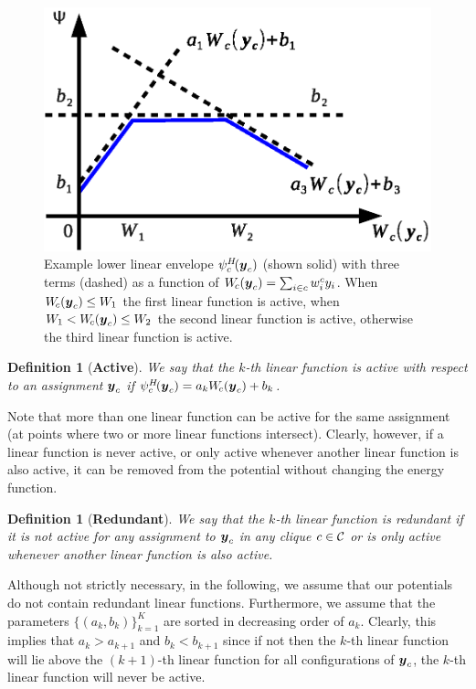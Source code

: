 \documentclass[10pt,journal,letterpaper,compsoc]{IEEEtran}
\newtheorem{defn}[thm]{Definition}
\begin{document}
\begin{figure}[t]
  \centering
  \includegraphics[width=0.8\columnwidth]{figures/not_redundant}
  \caption{\label{fig:nonredundant} Example lower linear envelope
    $\psi^H_c\!({\boldsymbol{y}}_c)$ (shown solid) with three terms (dashed) as a
    function of $W_{\!c}({\boldsymbol{y}}_c) = \sum_{i \in c} w^c_i y_i$.  When
    $W_{\!c}({\boldsymbol{y}}_c) \leq W_1$ the first linear function is active,
    when $W_1 < W_{\!c}({\boldsymbol{y}}_c) \leq W_2$ the second linear function is
    active, otherwise the third linear function is active.}
\end{figure}

\begin{defn}[{\bf Active}]
  We say that the $k$-th linear function is \emph{active} with respect
  to an assignment ${\boldsymbol{y}}_c$ if $\psi^H_c\!({\boldsymbol{y}}_c) = a_k W_{\!c}({\boldsymbol{y}}_c)
  + b_k$.
\end{defn}

Note that more than one linear function can be active for the same
assignment (\eg at points where two or more linear functions
intersect). Clearly, however, if a linear function is never active, or
only active whenever another linear function is also active, it can be
removed from the potential without changing the energy function.

\begin{defn}[{\bf Redundant}]
  We say that the $k$-th linear function is \emph{redundant} if it is
  not active for any assignment to ${\boldsymbol{y}}_c$ in any clique $c \in \C$ or
  is only active whenever another linear function is also active.
\end{defn}

Although not strictly necessary, in the following, we assume that our
potentials do not contain redundant linear functions. Furthermore, we
assume that the parameters $\{(a_k, b_k)\}_{k=1}^K$ are sorted in
decreasing order of $a_k$. Clearly, this implies that $a_k > a_{k+1}$
and $b_k < b_{k+1}$ since if not then the $k$-th linear function will
lie above the $(k+1)$-th linear function for all configurations of
${\boldsymbol{y}}_c$, \ie the $k$-th linear function will never be active.
\end{document}

